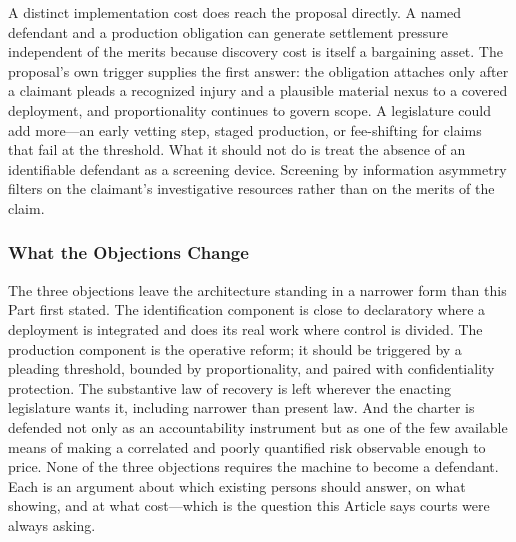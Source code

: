 A distinct implementation cost does reach the proposal directly. A named defendant
and a production obligation can generate settlement pressure independent of the
merits because discovery cost is itself a bargaining asset. The proposal's own
trigger supplies the first answer: the obligation attaches only after a claimant
pleads a recognized injury and a plausible material nexus to a covered
deployment, and proportionality continues to govern
scope. A legislature could add more---an early
vetting step, staged production, or fee-shifting for claims that fail at the
threshold. What it should not do is treat the absence of an identifiable
defendant as a screening device. Screening by information asymmetry filters on
the claimant's investigative resources rather than on the merits of the claim.

\subsubsection{What the Objections Change}

The three objections leave the architecture standing in a narrower form than
this Part first stated. The identification component is close to declaratory
where a deployment is integrated and does its real work where control is
divided. The production component is the operative reform; it should be
triggered by a pleading threshold, bounded by proportionality, and paired with
confidentiality protection. The substantive law of recovery is left wherever the
enacting legislature wants it, including narrower than present law. And the
charter is defended not only as an accountability instrument but as one of the
few available means of making a correlated and poorly quantified risk observable
enough to price. None of the three objections requires the machine to become a
defendant. Each is an argument about which existing persons should answer, on
what showing, and at what cost---which is the question this Article says courts
were always asking.
